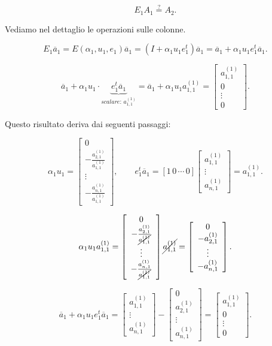 \begin{dimo}
\[E_1A_1 \stackrel{?}{=}  A_2.\]

Vediamo nel dettaglio le operazioni sulle colonne.

\[E_1\overline{a}_1 = E(\alpha_1, u_1, e_1)\overline{a}_1 =
(I + \alpha_1u_1e_1^t)\overline{a}_1 = \overline{a}_1 +
\alpha_1u_1e_1^t\overline{a}_1.
\]

\[
\overline{a}_1 +
\alpha_1u_1\cdot\underbrace{e_1^t\overline{a}_1}_{scalare:\, a_{1,1}^{(1)}} =
\overline{a}_1 + \alpha_1u_1a_{1,1}^{(1)} = \left[\begin{array}{c}
a_{1,1}^{(1)} \\
0 \\
\vdots \\
0
\end{array}\right].
\]

Questo risultato deriva dai seguenti passaggi:

\[
\alpha_1u_1 = \left[\begin{array}{c}
0 \\
-\frac{a_{2,1}^{(1)}}{a_{1,1}^{(1)}} \\
\vdots \\
-\frac{a_{n,1}^{(1)}}{a_{1,1}^{(1)}}
\end{array}\right],
\qquad
e_1^t\overline{a}_1 = \left[1\,0\,\cdots\,0\right]
\left[\begin{array}{c}
a_{1,1}^{(1)} \\
\vdots \\
a_{n,1}^{(1)}
\end{array}\right] = a_{1,1}^{(1)}.
\]

\[
\alpha_1u_1a_{1,1}^{(1)} =
\left[\begin{array}{c}
0 \\
-\frac{a_{2,1}^{(1)}}{\cancel{a_{1,1}^{(1)}}} \\
\vdots \\
-\frac{a_{n,1}^{(1)}}{\cancel{a_{1,1}^{(1)}}}
\end{array}\right]\cancel{a_{1,1}^{(1)}} =
\left[\begin{array}{c}
0\\
-a_{2,1}^{(1)} \\
\vdots \\
-a_{n,1}^{(1)}
\end{array}\right].
\]

\[
\overline{a}_1 + \alpha_1u_1e_1^t\overline{a}_1 =
\left[\begin{array}{c}
a_{1,1}^{(1)} \\
\vdots \\
a_{n,1}^{(1)}
\end{array}\right]- \left[\begin{array}{c}
0\\
a_{2,1}^{(1)} \\
\vdots \\
a_{n,1}^{(1)}
\end{array}\right] =
\left[\begin{array}{c}
a_{1,1}^{(1)} \\
0 \\
\vdots \\
0
\end{array}\right].
\]


\end{dimo}
